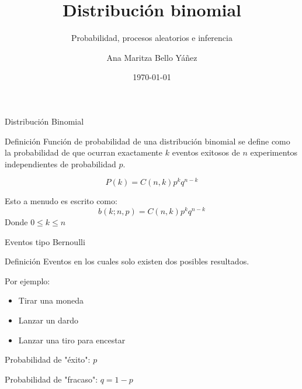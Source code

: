 \documentclass{beamer}
\title[ \hspace{21mm} \insertframenumber \ de \inserttotalframenumber ]
{Distribución binomial}
\subtitle
{Probabilidad, procesos aleatorios e inferencia}
\author[]
{Ana Maritza Bello Yáñez}
\institute[Instituto Polit\'ecnico Nacional]
{
  \inst{1}
  Centro de Investigaci\'on en Computaci\'on
  }
\date[Short Occasion]
{\today}
\begin{document}

\begin{frame}
  \titlepage
\end{frame}

\begin{frame}{Distribución Binomial}
  \begin{block}{Definición}
    Función de probabilidad de una distribución binomial se define como la
    probabilidad de que ocurran exactamente $k$ eventos exitosos de $n$ experimentos
    independientes de probabilidad $p$.

    \begin{equation}
      P(k) = C(n,k) p^k q^{n-k}
    \end{equation}

    Esto a menudo es escrito como:
    \begin{equation}
      b(k; n,p) = C(n,k) p^k q^{n-k}
    \end{equation}
    Donde $0 \leq k \leq n$
  \end{block}
\end{frame}

\begin{frame}{Eventos tipo Bernoulli}
  \begin{block}{Definición}
    Eventos en los cuales solo existen dos posibles resultados.

    Por ejemplo:

    \begin{itemize}
      \item Tirar una moneda
      \item Lanzar un dardo
      \item Lanzar una tiro para encestar
    \end{itemize}
  \end{block}

  \begin{block}{}
    Probabilidad de "éxito": $p$

    Probabilidad de "fracaso": $q = 1 - p$
  \end{block}

\end{frame}
\end{document}

